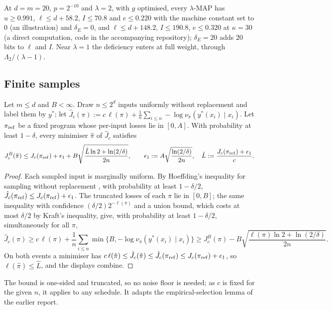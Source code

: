 At $d=m=20$, $p=2^{-10}$ and $\lambda=2$, with $g$ optimised, every $\lambda$-MAP has $u\ge0.991$, $\ell\le d+58.2$, $I\le70.8$ and $e\le0.220$ with the machine constant set to $0$ (an illustration) and $\delta_E=0$, and $\ell\le d+148.2$, $I\le190.8$, $e\le0.320$ at $\kappa=30$ (a direct computation, code in the accompanying repository); $\delta_E=20$ adds $20$ bits to $\ell$ and $I$. Near $\lambda=1$ the deficiency enters at full weight, through $\Lambda_2/(\lambda-1)$.

\subsection{Finite samples}\label{app:teacher:sampled}

\begin{lemma}\label{lem:teacher:finite}
Let $m\le d$ and $B<\infty$. Draw $n\le2^d$ inputs uniformly without replacement and label them by $y^*$; let $\hat J_c(\pi):=c\,\ell(\pi)+\frac1n\sum_{i\le n}-\log\nu_\pi(y^*(x_i)\mid x_i)$. Let $\pi_{\rm ref}$ be a fixed program whose per-input losses lie in $[0,A]$. With probability at least $1-\delta$, every minimiser $\hat\pi$ of $\hat J_c$ satisfies
\[
J^B_c(\hat\pi)\le J_c(\pi_{\rm ref})+\epsilon_1+B\sqrt{\frac{\hat L\ln2+\ln(2/\delta)}{2n}},\qquad \epsilon_1:=A\sqrt{\frac{\ln(2/\delta)}{2n}},\quad\hat L:=\frac{J_c(\pi_{\rm ref})+\epsilon_1}{c}.
\]
\end{lemma}

\begin{proof}
Each sampled input is marginally uniform. By Hoeffding's inequality for sampling without replacement \citep{hoeffding1963probability}, with probability at least $1-\delta/2$, $\hat J_c(\pi_{\rm ref})\le J_c(\pi_{\rm ref})+\epsilon_1$. The truncated losses of each $\pi$ lie in $[0,B]$; the same inequality with confidence $(\delta/2)2^{-\ell(\pi)}$ and a union bound, which costs at most $\delta/2$ by Kraft's inequality, give, with probability at least $1-\delta/2$, simultaneously for all $\pi$,
\[
\hat J_c(\pi)\ge c\,\ell(\pi)+\frac1n\sum_{i\le n}\min\{B,-\log\nu_\pi(y^*(x_i)\mid x_i)\}\ge J^B_c(\pi)-B\sqrt{\frac{\ell(\pi)\ln2+\ln(2/\delta)}{2n}}.
\]
On both events a minimiser has $c\,\ell(\hat\pi)\le\hat J_c(\hat\pi)\le\hat J_c(\pi_{\rm ref})\le J_c(\pi_{\rm ref})+\epsilon_1$, so $\ell(\hat\pi)\le\hat L$, and the displays combine.
\end{proof}

The bound is one-sided and truncated, so no noise floor is needed; as $c$ is fixed for the given $n$, it applies to any schedule. It adapts the empirical-selection lemma of the earlier report.

